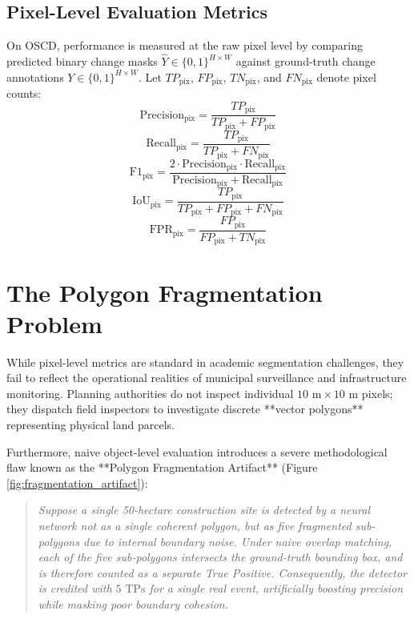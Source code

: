 \subsection{Pixel-Level Evaluation Metrics}
On OSCD, performance is measured at the raw pixel level by comparing predicted binary change masks $\hat{Y} \in \{0, 1\}^{H \times W}$ against ground-truth change annotations $Y \in \{0, 1\}^{H \times W}$. Let $TP_{\text{pix}}$, $FP_{\text{pix}}$, $TN_{\text{pix}}$, and $FN_{\text{pix}}$ denote pixel counts:
\begin{equation}
    \text{Precision}_{\text{pix}} = \frac{TP_{\text{pix}}}{TP_{\text{pix}} + FP_{\text{pix}}}
    \label{eq:pix_precision}
\end{equation}
\begin{equation}
    \text{Recall}_{\text{pix}} = \frac{TP_{\text{pix}}}{TP_{\text{pix}} + FN_{\text{pix}}}
    \label{eq:pix_recall}
\end{equation}
\begin{equation}
    \text{F1}_{\text{pix}} = \frac{2 \cdot \text{Precision}_{\text{pix}} \cdot \text{Recall}_{\text{pix}}}{\text{Precision}_{\text{pix}} + \text{Recall}_{\text{pix}}}
    \label{eq:pix_f1}
\end{equation}
\begin{equation}
    \text{IoU}_{\text{pix}} = \frac{TP_{\text{pix}}}{TP_{\text{pix}} + FP_{\text{pix}} + FN_{\text{pix}}}
    \label{eq:pix_iou}
\end{equation}
\begin{equation}
    \text{FPR}_{\text{pix}} = \frac{FP_{\text{pix}}}{FP_{\text{pix}} + TN_{\text{pix}}}
    \label{eq:pix_fpr}
\end{equation}

\section{The Polygon Fragmentation Problem}
\label{sec:exp_fragmentation_problem}
While pixel-level metrics are standard in academic segmentation challenges, they fail to reflect the operational realities of municipal surveillance and infrastructure monitoring. Planning authorities do not inspect individual $10\text{ m} \times 10\text{ m}$ pixels; they dispatch field inspectors to investigate discrete **vector polygons** representing physical land parcels.

Furthermore, naive object-level evaluation introduces a severe methodological flaw known as the **Polygon Fragmentation Artifact** (Figure \ref{fig:fragmentation_artifact}):
\begin{quote}
\textit{Suppose a single 50-hectare construction site is detected by a neural network not as a single coherent polygon, but as five fragmented sub-polygons due to internal boundary noise. Under naive overlap matching, each of the five sub-polygons intersects the ground-truth bounding box, and is therefore counted as a separate True Positive. Consequently, the detector is credited with $5\text{ TPs}$ for a single real event, artificially boosting precision while masking poor boundary cohesion.}
\end{quote}

